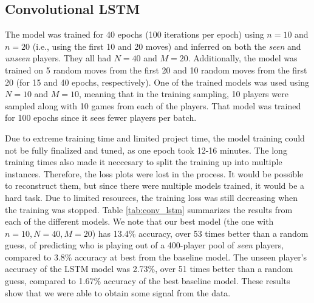\subsection{Convolutional LSTM}
The model was trained for 40 epochs (100 iterations per epoch) using $n = 10$ and $n = 20$ (i.e., using the first 10 and 20 moves) and inferred on both the \emph{seen} and \emph{unseen} players. They all had $N = 40$ and $M = 20$. Additionally, the model was trained on 5 random moves from the first 20 and 10 random moves from the first 20 (for 15 and 40 epochs, respectively). One of the trained models was used using $N = 10$ and $M = 10$, meaning that in the training sampling, 10 players were sampled along with 10 games from each of the players. That model was trained for 100 epochs since it sees fewer players per batch.
\medskip\par 
Due to extreme training time and limited project time, the model training could not be fully finalized and tuned, as one epoch took 12-16 minutes. The long training times also made it neccesary to split the training up into multiple instances. Therefore, the loss plots were lost in the process. It would be possible to reconstruct them, but since there were multiple models trained, it would be a hard task. Due to limited resources, the training loss was still decreasing when the training was stopped. Table \ref{tab:conv_lstm} summarizes the results from each of the different models. We note that our best model (the one with $n = 10, N = 40, M = 20$) has 13.4\% accuracy, over 53 times better than a random guess, of predicting who is playing out of a 400-player pool of \emph{seen} players, compared to 3.8\% accuracy at best from the baseline model. The unseen player's accuracy of the LSTM model was 2.73\%, over 51 times better than a random guess, compared to 1.67\% accuracy of the best baseline model. These results show that we were able to obtain some signal from the data.

